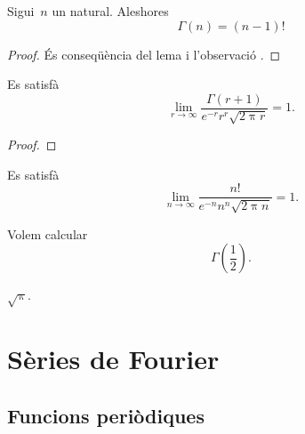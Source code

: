 \documentclass[../../main.tex]{subfiles}
\begin{document}
    \begin{lemma} %
        \label{lema:la Gamma d'Euler es comporta com un factorial}
        Sigui~\(n\) un natural.
        Aleshores
        \[
            \Gamma(n)=(n-1)!
        \]
    \end{lemma}
    \begin{proof}
        És conseqüència del lema  i l'observació .
    \end{proof}
    \begin{theorem}
        \label{thm:fórmula d'Stirling}
        Es satisfà
        \[
            \lim_{r\to\infty}\frac{\Gamma(r+1)}{e^{-r}r^{r}\sqrt{2\uppi r}}=1.
        \]
    \end{theorem}
    \begin{proof}
    \end{proof}
    \begin{corollary}
        \label{cor:fórmula d'Stirling}
        Es satisfà
        \[
            \lim_{n\to\infty}\frac{n!}{e^{-n}n^{n}\sqrt{2\uppi n}}=1.
        \]
    \end{corollary}
    \begin{example}
        Volem calcular
        \[
            \Gamma\left(\frac{1}{2}\right).
        \]
    \end{example}
    \begin{solution}
        \(\sqrt{\uppi}\).
    \end{solution}
\chapter{Sèries de Fourier}
\section{Funcions periòdiques}
\end{document}
